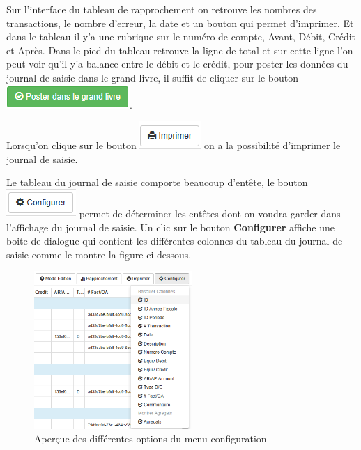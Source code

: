 \documentclass[12pt,a4paper]{report}
\begin{document}
Sur l'interface du tableau de rapprochement on retrouve les nombres des transactions, le nombre d'erreur, la date et un bouton qui permet d'imprimer.
Et dans le tableau il y'a une rubrique sur le numéro de compte, Avant, Débit, Crédit et Après. Dans le pied du tableau retrouve la ligne de total et sur cette ligne l'on peut voir qu'il y'a balance entre le débit et le crédit, pour poster les données du journal de saisie dans le grand livre, il suffit de cliquer sur le bouton \includegraphics[scale=0.7]{pic/PosterGrandLivre.png}.

Lorsqu'on clique sur le bouton \includegraphics[scale=0.7]{pic/Print.png} on a la possibilité d'imprimer le journal de saisie.

Le tableau du journal de saisie comporte beaucoup d'entête, le bouton \includegraphics[scale=0.7]{pic/Configurer.png} permet de déterminer les entêtes dont on voudra garder dans l'affichage du journal de saisie. Un clic sur le bouton \textbf{Configurer }affiche une boite de dialogue qui contient les différentes colonnes du tableau du journal de saisie comme le montre la figure ci-dessous.
\begin{figure}[h]
\begin{center}
\includegraphics[width=6cm]{pic/MenuConfiguration.png}
\end{center}
\caption{Aperçue des différentes options du menu configuration}
\label{Aperçue des différentes options du menu configuration}
\end{figure}
\end{document}
